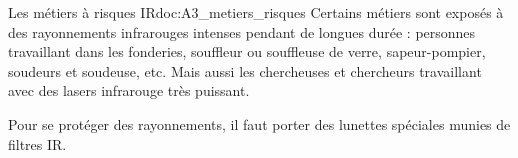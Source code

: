 \begin{doc}{Les métiers à risques IR}{doc:A3_metiers_risques}
  Certains métiers sont exposés à des rayonnements infrarouges intenses pendant de longues durée : personnes travaillant dans les fonderies, souffleur ou souffleuse de verre, sapeur-pompier, soudeurs et soudeuse, etc.
  Mais aussi les chercheuses et chercheurs travaillant avec des lasers infrarouge très puissant.

  Pour se protéger des rayonnements, il faut porter des lunettes spéciales munies de filtres IR.
\end{doc}



\newpage
{}


